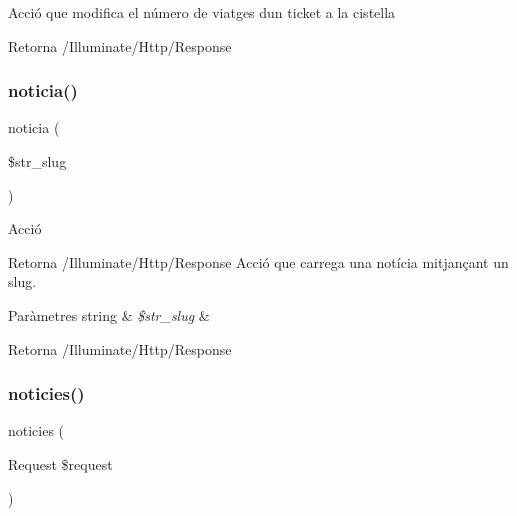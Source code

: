 Acció que modifica el número de viatges d\textquotesingle{}un ticket a la cistella \begin{DoxyReturn}{Retorna}
/\+Illuminate/\+Http/\+Response 
\end{DoxyReturn}
\mbox{\label{class_app_1_1_http_1_1_controllers_1_1_home_controller_a19fd5bebfe8684866269510bb89b92dc}} 
\subsubsection{\texorpdfstring{noticia()}{noticia()}}
{\footnotesize\ttfamily noticia (\begin{DoxyParamCaption}\item[{}]{\$str\+\_\+slug }\end{DoxyParamCaption})}

Acció

\begin{DoxyReturn}{Retorna}
/\+Illuminate/\+Http/\+Response Acció que carrega una notícia mitjançant un slug.
\end{DoxyReturn}

\begin{DoxyParams}[1]{Paràmetres}
string & {\em \$str\+\_\+slug} & \\
\hline
\end{DoxyParams}
\begin{DoxyReturn}{Retorna}
/\+Illuminate/\+Http/\+Response 
\end{DoxyReturn}
\mbox{\label{class_app_1_1_http_1_1_controllers_1_1_home_controller_aabb9523680ff3421356ae6ff2b61eed9}} 
\subsubsection{\texorpdfstring{noticies()}{noticies()}}
{\footnotesize\ttfamily noticies (\begin{DoxyParamCaption}\item[{Request}]{\$request }\end{DoxyParamCaption})}

